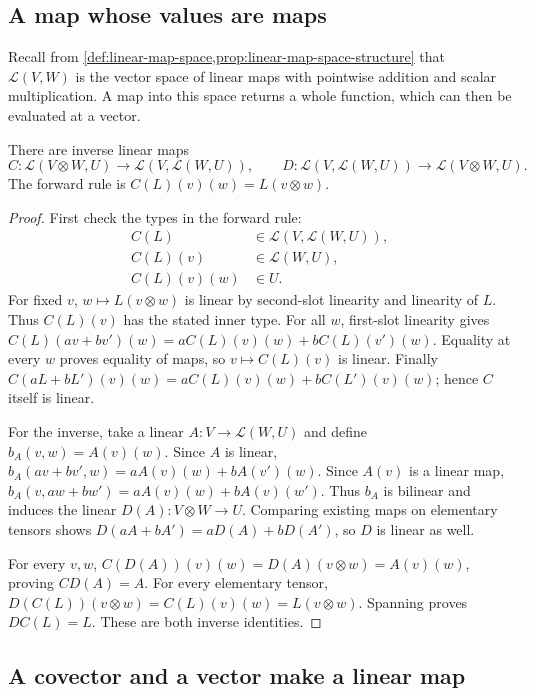\subsection{A map whose values are maps}
Recall from \cref{def:linear-map-space,prop:linear-map-space-structure} that
$\mathcal L(V,W)$ is the vector space of linear maps with pointwise addition
and scalar multiplication. A map into this space
returns a whole function, which can then be evaluated at a vector.
\begin{proposition}[Currying]\label{prop:tensor-hom}
There are inverse linear maps
\[
C:\mathcal L(V\otimes W,U)\to\mathcal L(V,\mathcal L(W,U)),\qquad
D:\mathcal L(V,\mathcal L(W,U))\to\mathcal L(V\otimes W,U).
\]
The forward rule is $C(L)(v)(w)=L(v\otimes w)$.
\end{proposition}
\begin{proof}
First check the types in the forward rule:
\[
\begin{aligned}
C(L)&\in\mathcal L(V,\mathcal L(W,U)),\\
C(L)(v)&\in\mathcal L(W,U),\\
C(L)(v)(w)&\in U.
\end{aligned}
\]
For fixed $v$, $w\mapsto L(v\otimes w)$ is linear by second-slot
linearity and linearity of $L$. Thus $C(L)(v)$ has the stated inner type.
For all $w$, first-slot linearity gives
$C(L)(av+bv')(w)=aC(L)(v)(w)+bC(L)(v')(w)$. Equality at every $w$
proves equality of maps, so $v\mapsto C(L)(v)$ is linear. Finally
$C(aL+bL')(v)(w)=aC(L)(v)(w)+bC(L')(v)(w)$; hence $C$ itself is linear.

For the inverse, take a linear $A:V\to\mathcal L(W,U)$ and define
$b_A(v,w)=A(v)(w)$. Since $A$ is linear,
$b_A(av+bv',w)=aA(v)(w)+bA(v')(w)$. Since $A(v)$ is a linear map,
$b_A(v,aw+bw')=aA(v)(w)+bA(v)(w')$. Thus $b_A$ is bilinear and induces
the linear $D(A):V\otimes W\to U$. Comparing existing maps on elementary
tensors shows $D(aA+bA')=aD(A)+bD(A')$, so $D$ is linear as well.

For every $v,w$,
$C(D(A))(v)(w)=D(A)(v\otimes w)=A(v)(w)$, proving $CD(A)=A$.
For every elementary tensor,
$D(C(L))(v\otimes w)=C(L)(v)(w)=L(v\otimes w)$.
Spanning proves $DC(L)=L$. These are both inverse identities.
\end{proof}

\subsection{A covector and a vector make a linear map}

